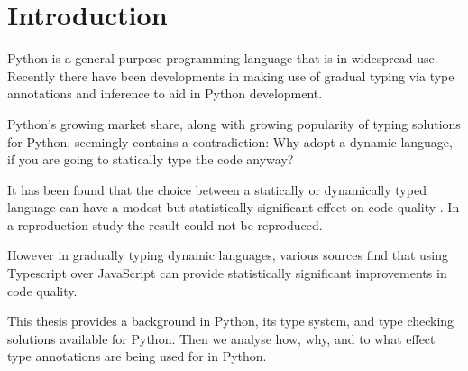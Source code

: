 \chapter{Introduction\label{intro}}


Python is a general purpose programming language that is in widespread use. Recently there have been developments in making use of gradual typing via type annotations and inference to aid in Python development.

Python's growing market share, along with growing popularity of typing solutions for Python, seemingly contains a contradiction: Why adopt a dynamic language, if you are going to statically type the code anyway?


It has been found that the choice between a statically or dynamically typed language can have a modest but statistically significant effect on code quality \cite{ray_codequality_2014}.
In a reproduction study \cite{codequality_reproudction_2019} the result could not be reproduced.

However in gradually typing dynamic languages, various sources find that using Typescript over JavaScript can provide statistically significant improvements in code quality. %


This thesis provides a background in Python, its type system, and type checking solutions available for Python. Then we analyse how, why, and to what effect type annotations are being used for in Python.






